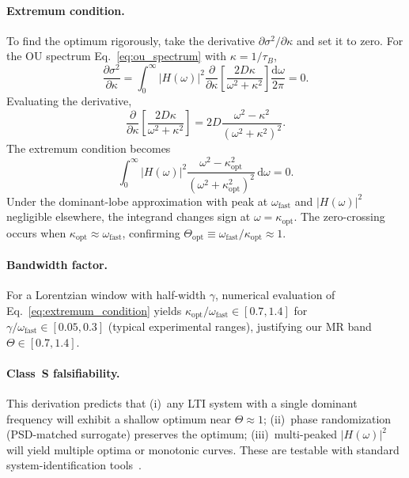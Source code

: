 \documentclass[11pt,letterpaper]{article}
\begin{document}
\paragraph{Extremum condition.} To find the optimum rigorously, take the derivative $\partial\sigma^2/\partial\kappa$ and set it to zero. For the OU spectrum Eq.~\eqref{eq:ou_spectrum} with $\kappa=1/\tau_B$,
\begin{equation}
\frac{\partial\sigma^2}{\partial\kappa} = \int_0^\infty |H(\omega)|^2 \frac{\partial}{\partial\kappa}\left[\frac{2D\kappa}{\omega^2+\kappa^2}\right]\frac{\mathrm{d}\omega}{2\pi} = 0.
\end{equation}
Evaluating the derivative,
\begin{equation}
\frac{\partial}{\partial\kappa}\left[\frac{2D\kappa}{\omega^2+\kappa^2}\right] = 2D\frac{\omega^2-\kappa^2}{(\omega^2+\kappa^2)^2}.
\end{equation}
The extremum condition becomes
\begin{equation}
\int_0^\infty |H(\omega)|^2 \frac{\omega^2-\kappa_{\text{opt}}^2}{(\omega^2+\kappa_{\text{opt}}^2)^2}\,\mathrm{d}\omega = 0.
\label{eq:extremum_condition}
\end{equation}
Under the dominant-lobe approximation with peak at $\omega_{\mathrm{fast}}$ and $|H(\omega)|^2$ negligible elsewhere, the integrand changes sign at $\omega=\kappa_{\text{opt}}$. The zero-crossing occurs when $\kappa_{\text{opt}} \approx \omega_{\mathrm{fast}}$, confirming $\Theta_{\text{opt}} \equiv \omega_{\mathrm{fast}}/\kappa_{\text{opt}} \approx 1$.

\paragraph{Bandwidth factor.} For a Lorentzian window with half-width $\gamma$, numerical evaluation of Eq.~\eqref{eq:extremum_condition} yields $\kappa_{\text{opt}}/\omega_{\mathrm{fast}} \in [0.7, 1.4]$ for $\gamma/\omega_{\mathrm{fast}} \in [0.05, 0.3]$ (typical experimental ranges), justifying our MR band $\Theta\in[0.7,1.4]$.

\paragraph{Class~S falsifiability.} This derivation predicts that (i)~any LTI system with a single dominant frequency will exhibit a shallow optimum near $\Theta\approx 1$; (ii)~phase randomization (PSD-matched surrogate) preserves the optimum; (iii)~multi-peaked $|H(\omega)|^2$ will yield multiple optima or monotonic curves. These are testable with standard system-identification tools~\cite{Priestley1981}.
\end{document}
